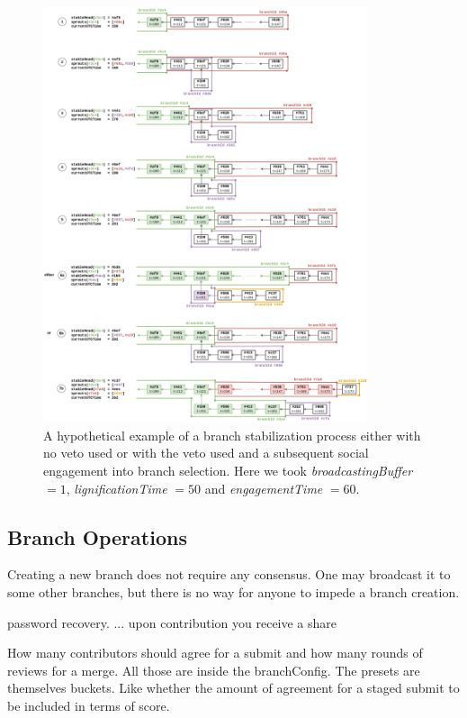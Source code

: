 \documentclass[14pt]{article}
\begin{document}
\begin{figure}[h!]
  \begin{center}
    \includegraphics[width=0.85\textwidth]{img/BranchBufferOtherScenarioV3.png}
\end{center}
 \caption{A hypothetical example of a branch stabilization process either with no veto used or with the veto used and a subsequent social engagement into branch selection. Here we took \textit{broadcastingBuffer} $=1$, \textit{lignificationTime} $=50$ and \textit{engagementTime} $=60$.}
 \label{fig:bufferbranches}
\end{figure}

\subsection{Branch Operations}
\label{ssc:branchops}

Creating a new branch does not require any consensus. One may broadcast it to some other branches, but there is no way for anyone to impede a branch creation. 

password recovery.  ... upon contribution you receive a share


How many contributors should agree for a submit and how many rounds of reviews for a merge. All those are inside the branchConfig.
The presets are themselves buckets. Like whether the amount of agreement for a staged submit to be included in terms of score. 
\end{document}
